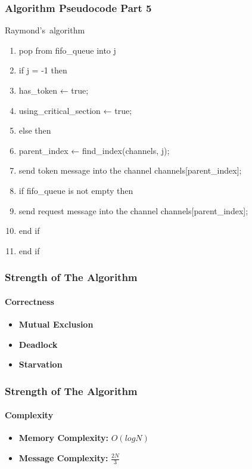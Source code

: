 \documentclass[11pt]{beamer}              %
\begin{document}
\begin{frame}
\frametitle{Algorithm Pseudocode Part 5}

\begin{center}
\begin{algorithm}[H]
	\scriptsize
	\def\algorithmlabel{Raymond's}
    \caption{\algorithmlabel\ algorithm}
    \label{alg:raymondsalgorithm}
    \begin{algorithmic}[1]
            \begin{enumerate}
                \item pop from fifo\_queue into j
                \item if j = -1 then
                \item \quad has\_token ← true;
                \item \quad using\_critical\_section ← true;
                \item else then
                \item \quad parent\_index ← find\_index(channels, j);
                \item \quad send token message into the channel channels[parent\_index];
                \item \quad \quad if fifo\_queue is not empty then
                \item \quad \quad send request message into the channel channels[parent\_index];
                \item \quad end if
                \item end if
            \end{enumerate}

    \end{algorithmic}
\end{algorithm}
\end{center}
\end{frame}

\begin{frame}
\frametitle{Strength of The Algorithm}
\framesubtitle{Correctness}
\begin{itemize}
    \item \textbf{Mutual Exclusion}
    \item \textbf{Deadlock}
    \item \textbf{Starvation}
\end{itemize}
\end{frame}

\begin{frame}
\frametitle{Strength of The Algorithm}
\framesubtitle{Complexity}
\begin{itemize}
    \item \textbf{Memory Complexity:} $O(logN)$
    \item \textbf{Message Complexity:} $\frac{2N}{3}$
\end{itemize}
\end{frame}
\end{document}
